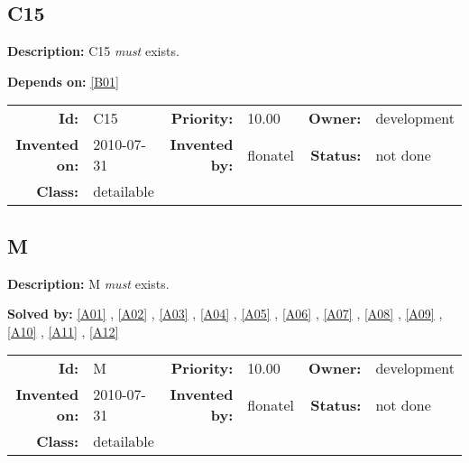\subsection{C15}\label{C15}
\textbf{Description:} C15 \textsl{must} exists.

\textbf{Depends on:} \ref{B01} 

\par
{\small \begin{center}\begin{tabular}{rlrlrl}
\textbf{Id:} & C15  & \textbf{Priority:} & 10.00  & \textbf{Owner:} & development\\ 
\textbf{Invented on:} & 2010-07-31  & \textbf{Invented by:} & flonatel  & \textbf{Status:} & not done \\ 
\textbf{Class:} & detailable  & & & \end{tabular}\end{center} }

\subsection{M}\label{M}
\textbf{Description:} M \textsl{must} exists.

\textbf{Solved by:} \ref{A01} , \ref{A02} , \ref{A03} , \ref{A04} , \ref{A05} , \ref{A06} , \ref{A07} , \ref{A08} , \ref{A09} , \ref{A10} , \ref{A11} , \ref{A12} 

\par
{\small \begin{center}\begin{tabular}{rlrlrl}
\textbf{Id:} & M  & \textbf{Priority:} & 10.00  & \textbf{Owner:} & development\\ 
\textbf{Invented on:} & 2010-07-31  & \textbf{Invented by:} & flonatel  & \textbf{Status:} & not done \\ 
\textbf{Class:} & detailable  & & & \end{tabular}\end{center} }

